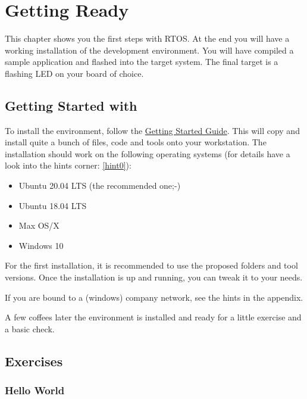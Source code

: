 
\chapter{Getting Ready}

This chapter shows you the first steps with \Zephyr RTOS. At the end you will have a working installation of the development environment. You will have compiled a sample application and flashed into the target system. The final target is a flashing LED on your board of choice. 

\section{Getting Started with \Zephyr}


To install the \Zephyr environment, follow the \href{https://docs.zephyrproject.org/latest/getting_started/index.html}{Getting Started Guide}. This will copy and install quite a bunch of files, code and tools onto your workstation. The installation should work on the following operating systems (for details have a look into the hints corner: \ref{hint0}):
\begin{itemize}
    \item Ubuntu 20.04 LTS (the recommended one;-)
    \item Ubuntu 18.04 LTS
    \item Max OS/X
    \item Windows 10
\end{itemize}

For the first installation, it is recommended to use the proposed folders and tool versions. Once the installation is up and running, you can tweak it to your needs. 


If you are bound to a (windows) company network, see the hints in the appendix. 

A few coffees later the environment is installed and ready for a little exercise and a basic check. 





\section{Exercises}

\subsection{Hello World}

